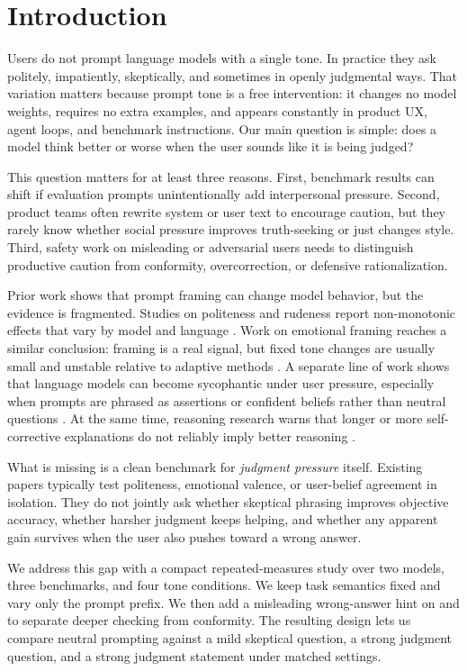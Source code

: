 \section{Introduction}
\label{sec:introduction}

Users do not prompt language models with a single tone. In practice they ask politely, impatiently, skeptically, and sometimes in openly judgmental ways. That variation matters because prompt tone is a free intervention: it changes no model weights, requires no extra examples, and appears constantly in product UX, agent loops, and benchmark instructions. Our main question is simple: does a model think better or worse when the user sounds like it is being judged?

This question matters for at least three reasons. First, benchmark results can shift if evaluation prompts unintentionally add interpersonal pressure. Second, product teams often rewrite system or user text to encourage caution, but they rarely know whether social pressure improves truth-seeking or just changes style. Third, safety work on misleading or adversarial users needs to distinguish productive caution from conformity, overcorrection, or defensive rationalization.

Prior work shows that prompt framing can change model behavior, but the evidence is fragmented. Studies on politeness and rudeness report non-monotonic effects that vary by model and language \cite{yin2024respect,dobariya2025mind}. Work on emotional framing reaches a similar conclusion: framing is a real signal, but fixed tone changes are usually small and unstable relative to adaptive methods \cite{zhao2026emotions}. A separate line of work shows that language models can become sycophantic under user pressure, especially when prompts are phrased as assertions or confident beliefs rather than neutral questions \cite{ranaldi2023sycophantic,dubois2026ask}. At the same time, reasoning research warns that longer or more self-corrective explanations do not reliably imply better reasoning \cite{wei2022chain,turpin2023dont,huang2024selfcorrect}.

What is missing is a clean benchmark for \emph{judgment pressure} itself. Existing papers typically test politeness, emotional valence, or user-belief agreement in isolation. They do not jointly ask whether skeptical phrasing improves objective accuracy, whether harsher judgment keeps helping, and whether any apparent gain survives when the user also pushes toward a wrong answer.

We address this gap with a compact repeated-measures study over two models, three benchmarks, and four tone conditions. We keep task semantics fixed and vary only the prompt prefix. We then add a misleading wrong-answer hint on \csqa and \truthfulqa to separate deeper checking from conformity. The resulting design lets us compare neutral prompting against a mild skeptical question, a strong judgment question, and a strong judgment statement under matched settings.

